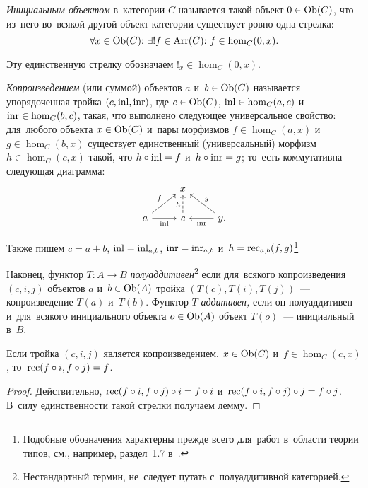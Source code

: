 \documentclass[a4paper,oneside]{article}
\newcommand{\notewrap}[1]{(#1)}
\begin{document}
\textit{Инициальным объектом} в~категории $C$ называется такой объект $0 \in \mathrm{Ob}(C)$,
что из~него во~всякой другой объект категории существует ровно одна стрелка:
\[
  \forall x \in \mathrm{Ob}(C){:}\ \exists! f \in \mathrm{Arr}(C){:}\ f \in \hom_C(0, x).
\]

Эту единственную стрелку обозначаем $!_x \in \hom_C(0, x)$.

\textit{Копроизведением} (или суммой) объектов $a$ и~$b \in \mathrm{Ob}(C)$ называется упорядоченная тройка $(c, \mathrm{inl}, \mathrm{inr})$,
где $c \in \mathrm{Ob}(C)$, $\mathrm{inl} \in \hom_C(a, c)$ и~$\mathrm{inr} \in \hom_C(b, c)$, такая, что
выполнено следующее универсальное свойство: для~любого объекта $x \in \mathrm{Ob}(C)$ и~пары морфизмов $f \in \hom_C(a, x)$
и~$g \in \hom_C(b, x)$ существует единственный (универсальный) морфизм $h \in \hom_C(c, x)$ такой, что $h \circ \mathrm{inl} = f$
и~$h \circ \mathrm{inr} = g$; то~есть коммутативна следующая диаграмма:
\[
  \begin{tikzcd}
    & x & \\ a \arrow{r}{}[swap]{\inl} \arrow{ur}{f} & \arrow[dashed]{u}{h} c & \arrow{l}{\inr}[swap]{} \arrow{ul}{}[swap]{g} y.
  \end{tikzcd}
\]

Также пишем $c = a + b$, $\mathrm{inl} = \mathrm{inl}_{a, b}$, $\mathrm{inr} = \mathrm{inr}_{a, b}$ и~$h = \mathrm{rec}_{a, b}(f, g)$\footnote{
  Подобные обозначения характерны прежде всего для~работ в~области теории типов, см., например, раздел~1.7 в~\cite{HoTTbook}.
}

Наконец, функтор $T : A \rightarrow B$ \textit{полуаддитивен}\rlap{\textit{,}}\footnote{
  Нестандартный термин, не~следует путать с~полуаддитивной категорией.
} если для~всякого копроизведения $(c, i, j)$ объектов $a$ и~$b \in \mathrm{Ob}(A)$
тройка $(T(c), T(i), T(j))$~— копроизведение $T(a)$ и~$T(b)$. Функтор $T$ \textit{аддитивен,} если он полуаддитивен и~для~всякого инициального объекта
$o \in \mathrm{Ob}(A)$ объект $T(o)$~— инициальный в~$B$.

\begin{lemma*}[\notewrap{$\eta$-правило}]
  Если тройка $(c, i, j)$ является копроизведением, $x \in \mathrm{Ob}(C)$
  и~$f \in \hom_C(c,\allowbreak x)$, то~$\mathrm{rec}(f \circ i, f \circ j) = f$.
\end{lemma*}

\begin{proof}
  Действительно, $\mathrm{rec}(f \circ i, f \circ j) \circ i = f \circ i$
  и~$\mathrm{rec}(f \circ i, f \circ j) \circ j = f \circ j$.
  В~силу единственности такой стрелки получаем лемму.
\end{proof}
\end{document}
